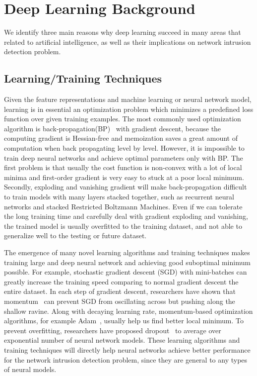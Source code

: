 \section{Deep Learning Background}
We identify three main reasons why deep learning succeed in many areas that related
to artificial intelligence, as well as their implications on network intrusion detection problem.

\subsection{Learning/Training Techniques}
Given the feature representations and machine learning or neural network model,
learning is in essential an optimization problem which minimizes a predefined loss function over given training examples.
The most commonly used optimization algorithm is back-propagation(BP)~\cite{Backpropagation} with gradient descent,
because the computing gradient is Hessian-free and memoization saves a great amount of computation when
back propagating level by level.
However, it is impossible to train deep neural networks and achieve optimal parameters only with BP.
The first problem is that usually the cost function is non-convex with a lot of local minima and
first-order gradient is very easy to stuck at a poor local minimum.
Secondly, exploding and vanishing gradient will make back-propagation difficult to train models with many layers stacked together, such as recurrent neural networks and stacked Restricted Boltzmann Machines.
Even if we can tolerate the long training time and carefully deal with gradient exploding and vanishing,
the trained model is usually overfitted to the training dataset, and not able to generalize well to the testing or future dataset.

The emergence of many novel learning algorithms and training techniques makes training large and deep
neural network and achieving good suboptimal minimum possible.
For example, stochastic gradient descent (SGD) with mini-batches can greatly increase the training speed comparing
to normal gradient descent the entire dataset.
In each step of gradient descent, researchers have shown that momentum~\cite{Momentum} can
prevent SGD from oscillating across but pushing along the shallow ravine.
Along with decaying learning rate, momentum-based optimization algorithms, for example Adam~\cite{Adam},
usually help us find better local minimum.
To prevent overfitting, researchers have proposed dropout~\cite{Dropout} to average over
exponential number of neural network models.
These learning algorithms and training techniques will directly help neural networks achieve
better performance for the network intrusion detection problem,
since they are general to any types of neural models.


